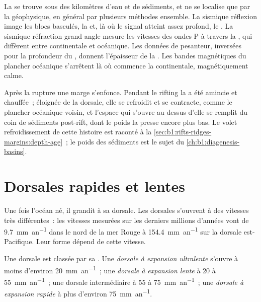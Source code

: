 \begin{inthefield}
La  se trouve sous des kilomètres d'eau et de sédiments,
et ne se localise que par la géophysique, en général par plusieurs méthodes ensemble.
La sismique réflexion image les blocs basculés, la  et,
là où le signal atteint assez profond, le . La sismique réfraction grand angle
mesure les vitesses des ondes P à travers la , qui diffèrent entre
 continentale et océanique. Les données de pesanteur, inversées pour la profondeur du
, donnent l'épaisseur de la . Les bandes magnétiques du plancher océanique
s'arrêtent là où commence la  continentale, magnétiquement calme.
\end{inthefield}

Après la rupture une marge s'enfonce. Pendant le rifting la  a été amincie et
chauffée~; éloignée de la dorsale, elle se refroidit et se contracte, comme le plancher océanique
voisin, et l'espace qui s'ouvre au-dessus d'elle se remplit du coin de
sédiments post-rift, dont le poids la presse encore plus bas. Le volet refroidissement de
cette histoire est raconté à la \cref{sec:b1:rifts-ridges-margins:depth-age}~; le
poids des sédiments est le sujet du \cref{ch:b1:diagenesis-basins}.

\section{Dorsales rapides et lentes}

Une fois l'océan né, il grandit à sa dorsale. Les dorsales s'ouvrent à des vitesses très
différentes~: les vitesses mesurées sur les derniers millions d'années vont de
\qty{9.7}{mm.an^{-1}} dans le nord de la mer Rouge à \qty{154.4}{mm.an^{-1}} sur
la dorsale est-Pacifique. Leur forme dépend de cette vitesse.

\begin{definition}\label{def:b1:rifts-ridges-margins:ridge-classes}
Une dorsale est classée par sa . Une
\emph{dorsale à expansion ultralente} s'ouvre à
moins d'environ \qty{20}{mm.an^{-1}}~; une \emph{dorsale à expansion lente} à 20 à \qty{55}{mm.an^{-1}}~; une
dorsale intermédiaire à 55 à \qty{75}{mm.an^{-1}}~; une \emph{dorsale à expansion rapide} à plus d'environ
\qty{75}{mm.an^{-1}}.
\end{definition}

